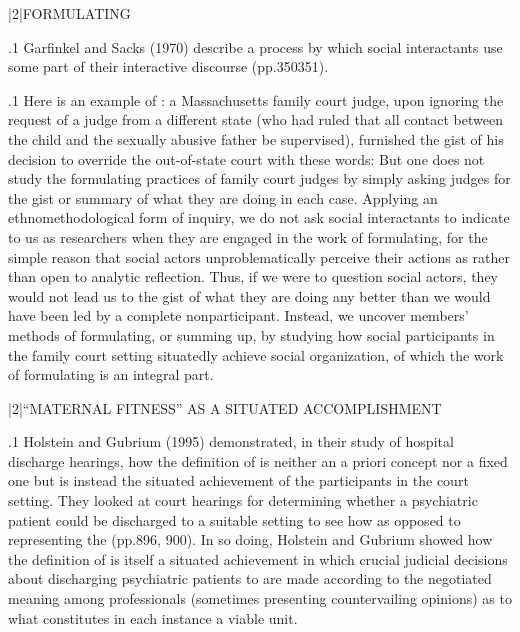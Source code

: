 \documentclass[11pt, twoside]{article}
\begin{document}
{\s|2|{FORMULATING}

\p.1{%
Garfinkel and Sacks (1970) describe a process by which social interactants use some part of their interactive discourse  (pp.\@ 350\ndash{}351).
}%

\p.1{%
Here is an example of : a Massachusetts family court
judge, upon ignoring the request of a judge from a different state (who
had ruled that all contact between the child and the sexually abusive
father be supervised), furnished the gist of his decision to override the
out-of-state court with these words: 
But one does not study the formulating practices of family court
judges by simply asking judges for the gist or summary of what they
are doing in each case. Applying an ethnomethodological form of
inquiry, we do not ask social interactants to indicate to us as researchers when they are engaged in the work of formulating, for the
simple reason that social actors unproblematically perceive their actions as  rather than open to analytic reflection.
Thus, if we were to question social actors, they would not lead us
to the gist of what they are doing any better than we would have
been led by a complete nonparticipant. Instead, we uncover members’ methods of formulating, or summing up, by studying how social participants in the family court setting situatedly achieve social organization, of which the work of formulating is an integral
part.
}%


\s|2|{``MATERNAL FITNESS'' AS A SITUATED ACCOMPLISHMENT}

\p.1{%
Holstein and Gubrium (1995) demonstrated, in their study of hospital discharge hearings, how the definition of  is neither an a
priori concept nor a fixed one but is instead the situated achievement
of the participants in the court setting. They looked at court hearings
for determining whether a psychiatric patient could be discharged to a
suitable setting to see how  as opposed to representing the  (pp.\@ 896, 900). In so doing, Holstein
and Gubrium showed how the definition of  is itself a situated achievement in which crucial judicial decisions about discharging
psychiatric patients to  are made according to the negotiated
meaning among professionals (sometimes presenting countervailing
opinions) as to what constitutes in each instance a viable  unit.
}%

}
\end{document}
